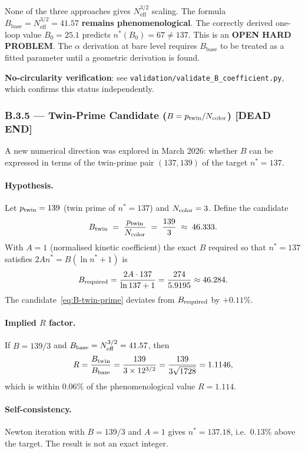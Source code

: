 \documentclass[11pt,a4paper]{article}
\theoremstyle{remark}
\begin{document}
None of the three approaches gives $N_{\mathrm{eff}}^{3/2}$ scaling.  The
formula $B_{\mathrm{base}} = N_{\mathrm{eff}}^{3/2} = 41.57$ \textbf{remains
phenomenological}.  The correctly derived one-loop value $B_0 = 25.1$ predicts
$n^*(B_0) = 67 \neq 137$.  This is an \textbf{OPEN HARD PROBLEM}.  The
$\alpha$ derivation at bare level requires $B_{\mathrm{base}}$ to be treated as
a fitted parameter until a geometric derivation is found.

\textbf{No-circularity verification}: see \texttt{validation/validate\_B\_coefficient.py},
which confirms this status independently.

\subsubsection*{B.3.5 — Twin-Prime Candidate ($B = p_{\rm twin}/N_{\rm color}$)
  \textbf{[DEAD END]}}
\label{sec:B3-twin-prime}

A new numerical direction was explored in March 2026: whether $B$ can be expressed
in terms of the twin-prime pair $(137, 139)$ of the target $n^* = 137$.

\paragraph{Hypothesis.}
Let $p_{\rm twin} = 139$ (twin prime of $n^* = 137$) and $N_{\rm color} = 3$.
Define the candidate
\begin{equation}
  B_{\rm twin} \;=\; \frac{p_{\rm twin}}{N_{\rm color}} \;=\; \frac{139}{3} \;\approx\; 46.333.
  \label{eq:B-twin-prime}
\end{equation}
With $A = 1$ (normalised kinetic coefficient) the exact $B$ required so that $n^* = 137$
satisfies $2An^* = B(\ln n^* + 1)$ is
\[
  B_{\rm required} = \frac{2A \cdot 137}{\ln 137 + 1} = \frac{274}{5.9195} \approx 46.284.
\]
The candidate~\eqref{eq:B-twin-prime} deviates from $B_{\rm required}$ by $+0.11\%$.

\paragraph{Implied $R$ factor.}
If $B = 139/3$ and $B_{\rm base} = N_{\rm eff}^{3/2} = 41.57$, then
\[
  R = \frac{B_{\rm twin}}{B_{\rm base}}
    = \frac{139}{3 \times 12^{3/2}}
    = \frac{139}{3\sqrt{1728}}
    = 1.1146,
\]
which is within $0.06\%$ of the phenomenological value $R = 1.114$.

\paragraph{Self-consistency.}
Newton iteration with $B = 139/3$ and $A = 1$ gives $n^* = 137.18$, i.e.\ $0.13\%$
above the target.  The result is not an exact integer.
\end{document}
